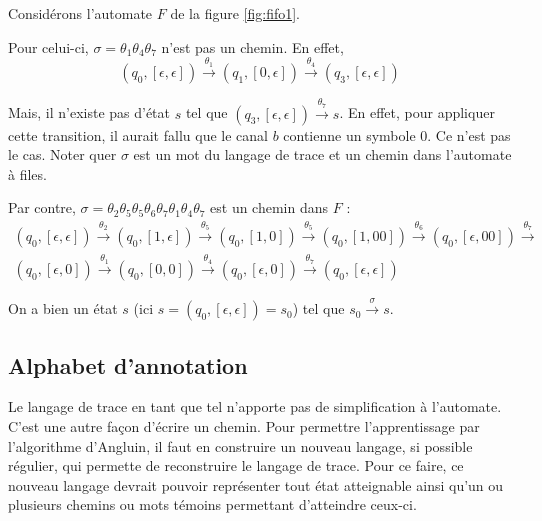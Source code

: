 \begin{example}
  Considérons l'automate $F$ de la figure \ref{fig:fifo1}.

  Pour celui-ci, $\sigma=\theta_1\theta_4\theta_7$ n'est pas un chemin. En effet,
  $$
  (q_0,[\epsilon,\epsilon])\xrightarrow{\theta_1}(q_1,[0,\epsilon])\xrightarrow{\theta_4}(q_3,[\epsilon,\epsilon])
  $$

  Mais, il n'existe pas d'état $s$ tel que $(q_3,[\epsilon,\epsilon])\xrightarrow{\theta_7}s$. En effet, pour appliquer cette transition, il aurait fallu que le canal $b$ contienne un symbole $0$. Ce n'est pas le cas. Noter quer $\sigma$ est un mot du langage de trace et un chemin dans l'automate à files.

  Par contre, $\sigma=\theta_2\theta_5\theta_5\theta_6\theta_7\theta_1\theta_4\theta_7$ est un chemin dans $F$ :
  \begin{equation*}
    \begin{gathered}
      (q_0,[\epsilon,\epsilon])\xrightarrow{\theta_2}
      (q_0,[1,\epsilon])\xrightarrow{\theta_5}
      (q_0,[1,0])\xrightarrow{\theta_5}
      (q_0,[1,00])\xrightarrow{\theta_6}
      (q_0,[\epsilon,00])\xrightarrow{\theta_7}\\
      (q_0,[\epsilon,0])\xrightarrow{\theta_1}
      (q_0,[0,0])\xrightarrow{\theta_4}
      (q_0,[\epsilon,0])\xrightarrow{\theta_7}
      (q_0,[\epsilon,\epsilon])
    \end{gathered}
  \end{equation*}

  On a bien un état $s$ (ici $s=(q_0,[\epsilon,\epsilon])=s_0$) tel que $s_0\xrightarrow{\sigma}s$.

\end{example}










\subsection{Alphabet d'annotation}

Le langage de trace en tant que tel n'apporte pas de simplification à l'automate. C'est une autre façon d'écrire un chemin. Pour permettre l'apprentissage par l'algorithme d'Angluin, il faut en construire un nouveau langage, si possible régulier, qui permette de reconstruire le langage de trace. Pour ce faire, ce nouveau langage devrait pouvoir représenter tout état atteignable ainsi qu'un ou plusieurs chemins ou mots témoins permettant d'atteindre ceux-ci.

